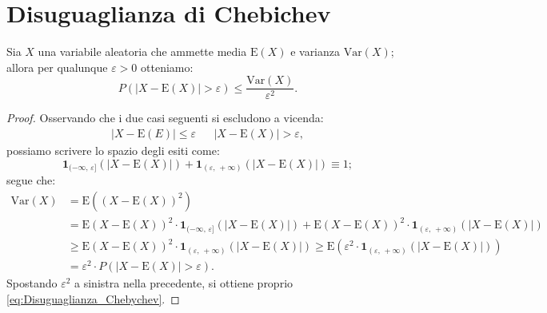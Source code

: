     \section{Disuguaglianza di Chebichev}
        \begin{defn}\label{defn:Disuguaglianza_Chebychev}
            Sia $X$ una variabile aleatoria che ammette media $\text{E}(X)$ e varianza $\text{Var}(X)$; allora per qualunque $\varepsilon > 0$ otteniamo:
            \begin{equation}\label{eq:Disuguaglianza_Chebychev}
                P\left(\left|X - \text{E}(X)\right| > \varepsilon\right) \leq \frac{\text{Var}(X)}{\varepsilon^2}
            .\end{equation}
        \end{defn}
        \begin{proof}
            Osservando che i due casi seguenti si escludono a vicenda:
            \begin{align*}
                \left|X - \text{E}(E)\right| \leq \varepsilon & & \left|X - \text{E}(X)\right| > \varepsilon
            ,\end{align*}
            possiamo scrivere lo spazio degli esiti come: \[
                \mathbf{1}_{(-\infty,\,\varepsilon]}(|X - \text{E}(X)|) + \mathbf{1}_{(\varepsilon,\,+\infty)}(|X - \text{E}(X)|) \equiv 1
            ;\] segue che:
            \begin{align*}
                \text{Var}(X) &= \text{E}((X - \text{E}(X))^2) \\
                              &= \text{E}(X - \text{E}(X))^2 \cdot \mathbf{1}_{(-\infty,\,\varepsilon]}(|X - \text{E}(X)|) + \text{E}(X - \text{E}(X))^2 \cdot \mathbf{1}_{(\varepsilon,\,+\infty)}(|X - \text{E}(X)|) \\
                              &\geq \text{E}(X - \text{E}(X))^2 \cdot \mathbf{1}_{(\varepsilon,\,+\infty)}(|X - \text{E}(X)|) \geq \text{E}(\varepsilon^2 \cdot \mathbf{1}_{(\varepsilon,\,+\infty)}(|X - \text{E}(X)|)) \\
                              &= \varepsilon^2 \cdot P(|X - \text{E}(X)| > \varepsilon)
            .\end{align*}
            Spostando $\varepsilon^2$ a sinistra nella precedente, si ottiene proprio \eqref{eq:Disuguaglianza_Chebychev}.
        \end{proof}
